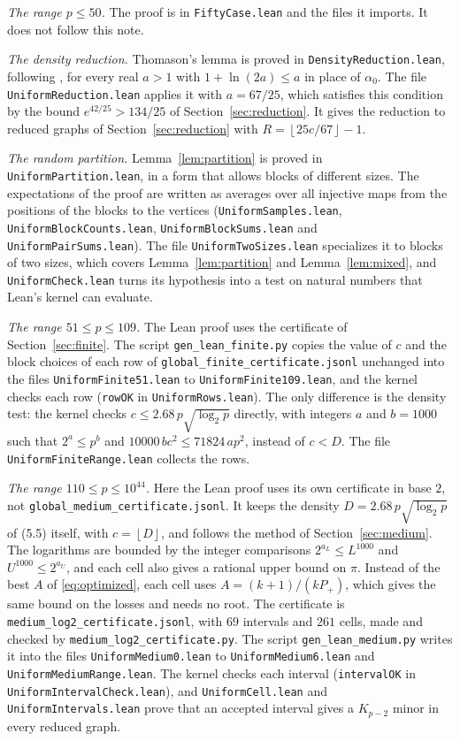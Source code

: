 \documentclass[11pt]{article}
\newcommand{\floor}[1]{\left\lfloor#1\right\rfloor}
\begin{document}
\emph{The range $p\le50$.} The proof is in \texttt{FiftyCase.lean} and the
files it imports. It does not follow this note.

\emph{The density reduction.} Thomason's lemma is proved in
\texttt{DensityReduction.lean}, following \cite{thomason}, for every real
$a>1$ with $1+\ln(2a)\le a$ in place of $\alpha_0$. The file
\texttt{UniformReduction.lean} applies it with $a=67/25$, which satisfies
this condition by the bound $e^{42/25}>134/25$ of
Section~\ref{sec:reduction}. It gives the reduction to reduced graphs of
Section~\ref{sec:reduction} with $R=\floor{25c/67}-1$.

\emph{The random partition.} Lemma~\ref{lem:partition} is proved in
\texttt{UniformPartition.lean}, in a form that allows blocks of different
sizes. The expectations of the proof are written as averages over all
injective maps from the positions of the blocks to the vertices
(\texttt{UniformSamples.lean}, \texttt{UniformBlockCounts.lean},
\texttt{UniformBlockSums.lean} and \texttt{UniformPairSums.lean}). The file
\texttt{UniformTwoSizes.lean} specializes it to blocks of two sizes, which
covers Lemma~\ref{lem:partition} and Lemma~\ref{lem:mixed}, and
\texttt{UniformCheck.lean} turns its hypothesis into a test on natural
numbers that Lean's kernel can evaluate.

\emph{The range $51\le p\le109$.} The Lean proof uses the certificate of
Section~\ref{sec:finite}. The script \texttt{gen\_lean\_finite.py} copies the
value of $c$ and the block choices of each row of
\texttt{global\_finite\_certificate.jsonl} unchanged into the files
\texttt{UniformFinite51.lean} to \texttt{UniformFinite109.lean}, and the
kernel checks each row (\texttt{rowOK} in \texttt{UniformRows.lean}). The
only difference is the density test: the kernel checks
$c\le2.68\,p\sqrt{\log_2p}$ directly, with integers $a$ and $b=1000$ such that
$2^a\le p^b$ and $10000\,bc^2\le71824\,ap^2$, instead of $c<D$. The file
\texttt{UniformFiniteRange.lean} collects the rows.

\emph{The range $110\le p\le10^{44}$.} Here the Lean proof uses its own
certificate in base $2$, not \texttt{global\_medium\_certificate.jsonl}. It
keeps the density $D=2.68\,p\sqrt{\log_2p}$ of (5.5) itself, with
$c=\floor{D}$, and follows the method of Section~\ref{sec:medium}. The
logarithms are bounded by the integer comparisons $2^{a_L}\le L^{1000}$ and
$U^{1000}\le2^{a_U}$, and each cell also gives a rational upper bound on
$\pi$. Instead of the best $A$ of \eqref{eq:optimized}, each cell uses
$A=(k+1)/(kP_+)$, which gives the same bound on the losses and needs no
root. The certificate is \texttt{medium\_log2\_certificate.jsonl}, with $69$
intervals and $261$ cells, made and checked by
\texttt{medium\_log2\_certificate.py}. The script
\texttt{gen\_lean\_medium.py} writes it into the files
\texttt{UniformMedium0.lean} to \texttt{UniformMedium6.lean} and
\texttt{UniformMediumRange.lean}. The kernel checks each interval
(\texttt{intervalOK} in \texttt{UniformIntervalCheck.lean}), and
\texttt{UniformCell.lean} and \texttt{UniformIntervals.lean} prove that an
accepted interval gives a $K_{p-2}$ minor in every reduced graph.
\end{document}
